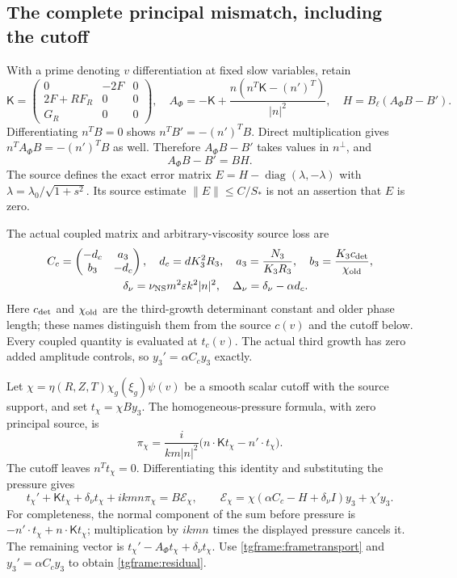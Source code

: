 \documentclass[11pt]{article}
\begin{document}
\subsection{The complete principal mismatch, including the cutoff}

With a prime denoting $v$ differentiation at fixed slow variables,
retain
\[
 \mathsf K=\begin{pmatrix}0&-2F&0\\2F+RF_R&0&0\\G_R&0&0\end{pmatrix},
 \quad
 A_\Phi=-\mathsf K+
        \frac{n(n^T\mathsf K-(n')^T)}{|n|^2},
 \quad H=B_\ell(A_\Phi B-B').
\]
Differentiating $n^TB=0$ shows
$n^TB'=-(n')^TB$. Direct multiplication gives
$n^TA_\Phi B=-(n')^TB$ as well. Therefore
$A_\Phi B-B'$ takes values in $n^\perp$, and
\begin{equation}\label{tgframe:frametransport}
 A_\Phi B-B'=BH.
\end{equation}
The source defines the exact error matrix
$E=H-\operatorname{diag}(\lambda,-\lambda)$ with
$\lambda=\lambda_0/\sqrt{1+s^2}$. Its source estimate
$\|E\|\le C/S_*$ is not an assertion that $E$ is zero.

The actual coupled matrix and arbitrary-viscosity source loss are
\[
\begin{gathered}
 C_c=\begin{pmatrix}-d_c&a_3\\b_3&-d_c\end{pmatrix},
 \quad d_c=dK_3^2R_3,\quad
 a_3=\frac{N_3}{K_3R_3},\quad b_3=\frac{K_3c_{\rm det}}{\chi_{\rm old}},\\
 \quad
 \delta_\nu=\nu_{\rm NS}m^2\varepsilon k^2|n|^2,\quad
 \Delta_\nu=\delta_\nu-\alpha d_c.
\end{gathered}
\]
Here $c_{\rm det}$ and $\chi_{\rm old}$ are the third-growth determinant
constant and older phase length; these names distinguish them from the
source $c(v)$ and the cutoff below. Every coupled quantity is evaluated
at $t_c(v)$. The actual third growth has zero added amplitude controls,
so $y_3'=\alpha C_cy_3$ exactly.

Let $\chi=\eta(R,Z,T)\chi_g(\xi_g)\psi(v)$ be a smooth scalar
cutoff with the source support, and set $t_\chi=\chi By_3$.
The homogeneous-pressure formula, with zero principal source, is
\[
 \pi_\chi=\frac{i}{km|n|^2}
        \bigl(n\cdot\mathsf Kt_\chi-n'\cdot t_\chi\bigr).
\]
The cutoff leaves $n^Tt_\chi=0$. Differentiating this identity
and substituting the pressure gives
\begin{equation}\label{tgframe:residual}
 t_\chi'+\mathsf Kt_\chi+\delta_\nu t_\chi+ikmn\pi_\chi
 =B\mathcal E_\chi,\qquad
 \mathcal E_\chi=\chi(\alpha C_c-H+\delta_\nu I)y_3+\chi'y_3.
\end{equation}
For completeness, the normal component of the sum before pressure is
$-n'\cdot t_\chi+n\cdot\mathsf Kt_\chi$; multiplication by $ikmn$
times the displayed pressure cancels it. The remaining vector is
$t_\chi'-A_\Phi t_\chi+\delta_\nu t_\chi$. Use
\eqref{tgframe:frametransport} and $y_3'=\alpha C_cy_3$ to obtain
\eqref{tgframe:residual}.
\end{document}
